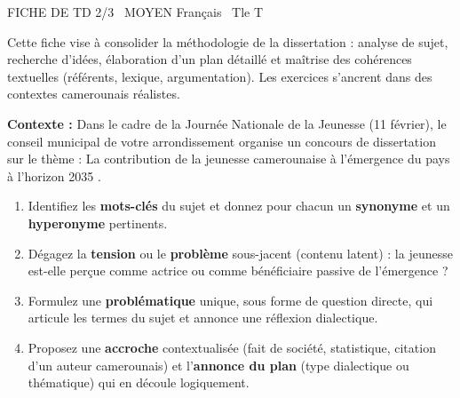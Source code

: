 \documentclass[11pt]{article}
\begin{document}
\begin{tcolorbox}[
  enhanced, colback=popink, colframe=popink, arc=10pt, boxrule=0pt,
  left=12pt, right=12pt, top=9pt, bottom=9pt
]
{\color{white}\popxbold\small FICHE DE TD 2/3 \textbullet\ MOYEN \hfill Français \textbullet\ Tle T\par}
\end{tcolorbox}
\vspace{4pt}

\noindent Cette fiche vise à consolider la méthodologie de la dissertation : analyse de sujet, recherche d'idées, élaboration d'un plan détaillé et maîtrise des cohérences textuelles (référents, lexique, argumentation). Les exercices s'ancrent dans des contextes camerounais réalistes.

\begin{exercice}
\textbf{Contexte :} Dans le cadre de la Journée Nationale de la Jeunesse (11 février), le conseil municipal de votre arrondissement organise un concours de dissertation sur le thème : \og La contribution de la jeunesse camerounaise à l'émergence du pays à l'horizon 2035 \fg{}.

\begin{enumerate}
    \item Identifiez les \textbf{mots-clés} du sujet et donnez pour chacun un \textbf{synonyme} et un \textbf{hyperonyme} pertinents.
    \item Dégagez la \textbf{tension} ou le \textbf{problème} sous-jacent (contenu latent) : la jeunesse est-elle perçue comme actrice ou comme bénéficiaire passive de l'émergence ?
    \item Formulez une \textbf{problématique} unique, sous forme de question directe, qui articule les termes du sujet et annonce une réflexion dialectique.
    \item Proposez une \textbf{accroche} contextualisée (fait de société, statistique, citation d'un auteur camerounais) et l'\textbf{annonce du plan} (type dialectique ou thématique) qui en découle logiquement.
\end{enumerate}
\end{exercice}
\end{document}
